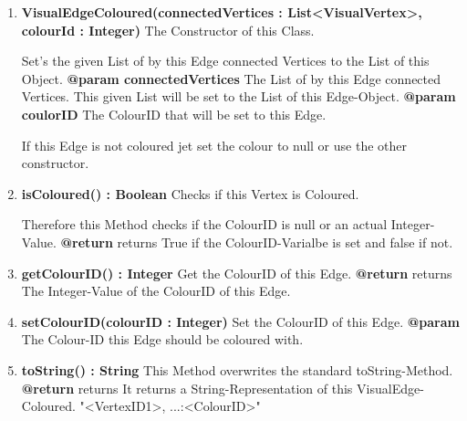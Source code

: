 \documentclass{article}
\begin{document}
				\begin{enumerate}[+]
					\item{
						\textbf{VisualEdgeColoured(connectedVertices : List<VisualVertex>, colourId : Integer)} \newline
							The Constructor of this Class.
							
							Set's the given List of by this Edge connected Vertices to the List of this Object.
						\newline
						\textbf{@param connectedVertices}
							The List of by this Edge connected Vertices.
							This given List will be set to the List of this Edge-Object.
							\newline
						\textbf{@param coulorID}
							The ColourID that will be set to this Edge.
							
							If this Edge is not coloured jet set the colour to null or use the other constructor.
					}
					\item{
						\textbf{isColoured() : Boolean} \newline
						Checks if this Vertex is Coloured.
						
						Therefore this Method checks if the ColourID is null or an actual Integer-Value.
						\newline
						\textbf{@return} returns
						True if the ColourID-Varialbe is set and false if not.
						\newline
					}
					\item{
						\textbf{getColourID() : Integer} \newline
						Get the ColourID of this Edge.
						\newline
						\textbf{@return} returns
						The Integer-Value of the ColourID of this Edge.
						\newline
					}
					\item{
						\textbf{setColourID(colourID : Integer)} \newline
						Set the ColourID of this Edge.
						\newline
						\textbf{@param}
							The Colour-ID this Edge should be coloured with.
							\newline
					}
					\item{
						\textbf{toString() : String} \newline
						This Method overwrites the standard toString-Method.
						\newline
						\textbf{@return} returns
							It returns a String-Representation of this VisualEdge-Coloured.
							"{<VertexID1>, ...}:<ColourID>"
							\newline
					}
				\end{enumerate}
			
\end{document}
